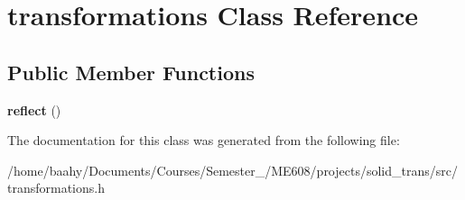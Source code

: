 \hypertarget{classtransformations}{}\section{transformations Class Reference}
\label{classtransformations}
\subsection*{Public Member Functions}
\begin{DoxyCompactItemize}
\item 
\mbox{\label{classtransformations_ab0c0b6446000a88541646a2265dc9bac}} 
{\bfseries reflect} ()
\end{DoxyCompactItemize}


The documentation for this class was generated from the following file\+:\begin{DoxyCompactItemize}
\item 
/home/baahy/\+Documents/\+Courses/\+Semester\+\_/\+M\+E608/projects/solid\+\_\+trans/src/transformations.\+h\end{DoxyCompactItemize}
